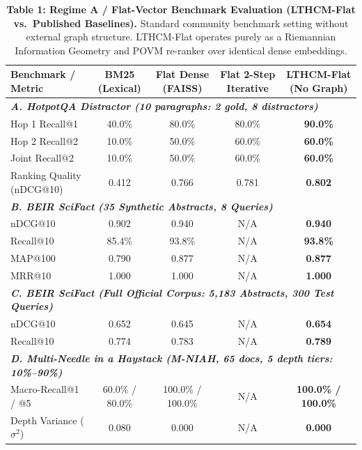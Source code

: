 \documentclass[11pt,a4paper]{article}
\begin{document}
\begin{table}[t]
\centering
\small
\caption{\textbf{Table 1: Regime A / Flat-Vector Benchmark Evaluation (LTHCM-Flat vs.\ Published Baselines).} Standard community benchmark setting without external graph structure. LTHCM-Flat operates purely as a Riemannian Information Geometry and POVM re-ranker over identical dense embeddings.}
\label{tab:initial_results}
\vspace{0.5em}
\begin{tabular}{lcccc}
\toprule
\textbf{Benchmark / Metric} & \textbf{BM25 (Lexical)} & \textbf{Flat Dense (FAISS)} & \textbf{Flat 2-Step Iterative} & \textbf{LTHCM-Flat (No Graph)} \\
\midrule
\multicolumn{5}{l}{\textit{\textbf{A. HotpotQA Distractor (10 paragraphs: 2 gold, 8 distractors)}}} \\
Hop 1 Recall@1 & 40.0\% & 80.0\% & 80.0\% & \textbf{90.0\%} \\
Hop 2 Recall@2 & 10.0\% & 50.0\% & 60.0\% & \textbf{60.0\%} \\
Joint Recall@2 & 10.0\% & 50.0\% & 60.0\% & \textbf{60.0\%} \\
Ranking Quality (nDCG@10) & 0.412 & 0.766 & 0.781 & \textbf{0.802} \\
\midrule
\multicolumn{5}{l}{\textit{\textbf{B. BEIR SciFact (35 Synthetic Abstracts, 8 Queries)}}} \\
nDCG@10 & 0.902 & 0.940 & N/A & \textbf{0.940} \\
Recall@10 & 85.4\% & 93.8\% & N/A & \textbf{93.8\%} \\
MAP@100 & 0.790 & 0.877 & N/A & \textbf{0.877} \\
MRR@10 & 1.000 & 1.000 & N/A & \textbf{1.000} \\
\midrule
\multicolumn{5}{l}{\textit{\textbf{C. BEIR SciFact (Full Official Corpus: 5,183 Abstracts, 300 Test Queries)}}} \\
nDCG@10 & 0.652 & 0.645 & N/A & \textbf{0.654} \\
Recall@10 & 0.774 & 0.783 & N/A & \textbf{0.789} \\
\midrule
\multicolumn{5}{l}{\textit{\textbf{D. Multi-Needle in a Haystack (M-NIAH, 65 docs, 5 depth tiers: 10\%--90\%)}}} \\
Macro-Recall@1 / @5 & 60.0\% / 80.0\% & 100.0\% / 100.0\% & N/A & \textbf{100.0\% / 100.0\%} \\
Depth Variance ($\sigma^2$) & 0.080 & 0.000 & N/A & \textbf{0.000} \\
\bottomrule
\end{tabular}
\end{table}
\end{document}
